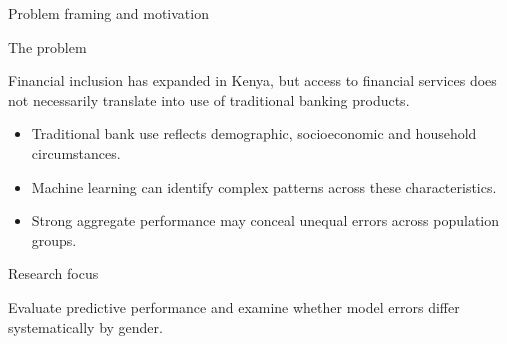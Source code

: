 \documentclass[aspectratio=169,10pt]{beamer}
\begin{document}

\begin{frame}{Problem framing and motivation}

\begin{block}{The problem}

Financial inclusion has expanded in Kenya, but access to financial services does not necessarily translate into use of traditional banking products.

\end{block}

\begin{itemize}

    \item Traditional bank use reflects demographic, socioeconomic and household circumstances.

    \item Machine learning can identify complex patterns across these characteristics.

    \item Strong aggregate performance may conceal unequal errors across population groups.

\end{itemize}

\begin{alertblock}{Research focus}

Evaluate predictive performance and examine whether model errors differ systematically by gender.

\end{alertblock}

\end{frame}

\end{document}

